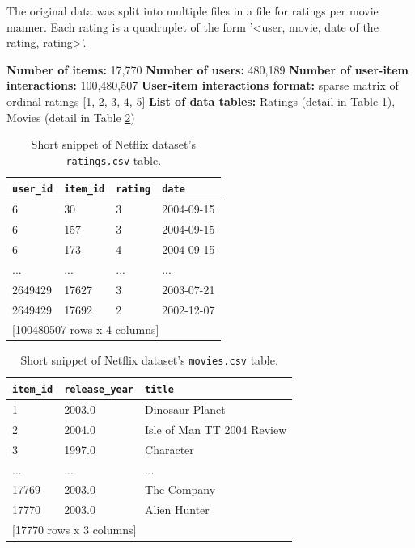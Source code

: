 The original data was split into multiple files in a file for ratings per movie manner. Each rating is a quadruplet of the form '\textless user, movie, date of the rating, rating\textgreater'.

\hfill \break
\noindent
\textbf{Number of items:} 17,770 \newline
\textbf{Number of users:} 480,189 \newline
\textbf{Number of user-item interactions:} 100,480,507 \newline
\textbf{User-item interactions format:} sparse matrix of ordinal ratings [1, 2, 3, 4, 5] \newline
\textbf{List of data tables:} Ratings (detail in Table \ref{table:5.1_Netflix_ratings}), Movies (detail in Table \ref{table:5.1_Netflix_movies})

\begin{table}[!ht]
    \centering
    \begin{tabular}{ l l l l }
        \verb|user_id| & \verb|item_id| & \verb|rating| & \verb|date| \\
        \hline
              6 &             30 &             3 &  2004-09-15 \\
              6 &            157 &             3 &  2004-09-15 \\
              6 &            173 &             4 &  2004-09-15 \\
            ... &            ... &           ... &         ... \\
        2649429 &          17627 &             3 &  2003-07-21 \\
        2649429 &          17692 &             2 &  2002-12-07 \\ [1mm]
        \multicolumn{4}{l}{{[100480507 rows x 4 columns]}}
    \end{tabular}
    \caption{Short snippet of Netflix dataset's \texttt{ratings.csv} table.}
    \label{table:5.1_Netflix_ratings}
\end{table}
    
\begin{table}[!ht]
    \centering
    \begin{tabular}{ l l l }
        \verb|item_id| & \verb|release_year| & \verb|title| \\
        \hline
            1 &       2003.0 &            Dinosaur Planet    \\
            2 &       2004.0 & Isle of Man TT 2004 Review    \\
            3 &       1997.0 &                  Character    \\
          ... &          ... &                        ...    \\
        17769 &       2003.0 &                The Company    \\
        17770 &       2003.0 &               Alien Hunter \\ [1mm]
        \multicolumn{3}{l}{{[17770 rows x 3 columns]}}
    \end{tabular}
    \caption{Short snippet of Netflix dataset's \texttt{movies.csv} table.}
    \label{table:5.1_Netflix_movies}
\end{table}
